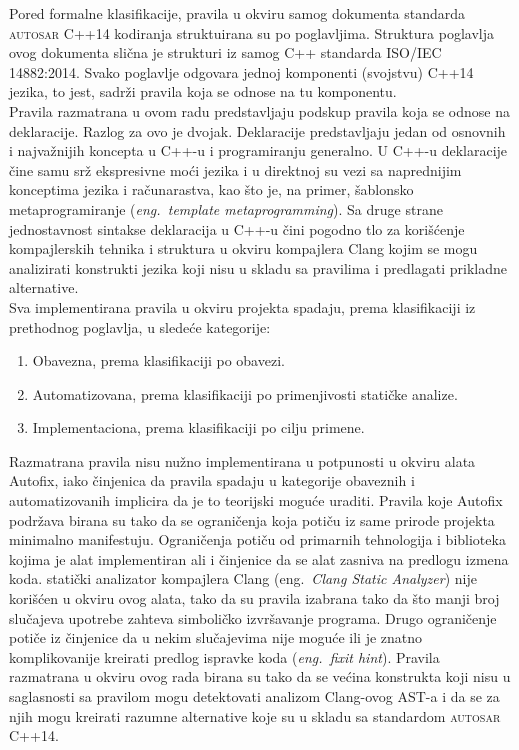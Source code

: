 \documentclass[12pt,oneside]{memoir}
\begin{document}
Pored formalne klasifikacije, pravila u okviru samog dokumenta standarda \textsc{autosar} C++14  kodiranja struktuirana su po poglavljima.
Struktura poglavlja ovog dokumenta slična je strukturi iz samog C++ standarda ISO/IEC 14882:2014. Svako poglavlje odgovara jednoj komponenti (svojstvu) C++14 jezika, to jest, sadrži pravila koja se odnose na tu komponentu.
\\
\indent
Pravila razmatrana u ovom radu predstavljaju podskup pravila koja se odnose na deklaracije. Razlog za ovo je dvojak. Deklaracije predstavljaju jedan
od osnovnih i najvažnijih koncepta u C++-u i programiranju generalno. U C++-u deklaracije čine samu srž ekspresivne moći jezika i u direktnoj su vezi
sa naprednijim konceptima jezika i računarastva, kao što je, na primer, šablonsko metaprogramiranje (\textit{eng.~template metaprogramming}).
Sa druge strane jednostavnost sintakse deklaracija u C++-u čini pogodno tlo za korišćenje kompajlerskih tehnika i struktura u okviru kompajlera Clang kojim se mogu analizirati konstrukti jezika koji nisu u skladu sa pravilima i predlagati prikladne alternative.
\\
\indent
Sva implementirana pravila u okviru projekta spadaju, prema klasifikaciji iz prethodnog poglavlja, u sledeće kategorije:
\begin{enumerate}
  \item{Obavezna, prema klasifikaciji po obavezi.}
  \item{Automatizovana, prema klasifikaciji po primenjivosti statičke analize.}
  \item{Implementaciona, prema klasifikaciji po cilju primene.}
\end{enumerate}

Razmatrana pravila nisu nužno implementirana u potpunosti u okviru alata Autofix, iako činjenica da pravila spadaju u kategorije obaveznih i automatizovanih
implicira da je to teorijski moguće uraditi. Pravila koje Autofix podržava birana su tako da se ograničenja koja potiču iz same prirode projekta minimalno manifestuju. Ograničenja potiču od primarnih tehnologija i biblioteka kojima je alat implementiran ali i činjenice da se alat zasniva na predlogu izmena koda. 
stati\v{c}ki analizator kompajlera Clang \cite{CSAWebsite} (eng.~\textit{Clang Static Analyzer}) nije korišćen u okviru ovog alata, tako da su pravila izabrana tako da što manji broj slučajeva upotrebe zahteva simboličko izvršavanje programa. Drugo ograničenje potiče iz činjenice da u nekim slučajevima nije moguće ili je znatno komplikovanije kreirati predlog ispravke koda (\textit{eng.~fixit hint}). Pravila razmatrana u okviru ovog rada birana su tako da se većina konstrukta koji nisu u saglasnosti sa pravilom mogu detektovati analizom Clang-ovog AST-a i da se za njih mogu kreirati razumne alternative koje su u skladu sa standardom \textsc{autosar} C++14.
\end{document}
